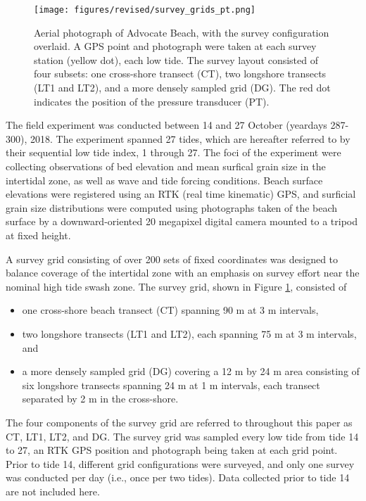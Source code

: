 \documentclass[jmse,article,submit,pdftex,moreauthors]{Definitions/mdpi}
\begin{document}
\begin{figure}[tbp] %
	\texttt{[image: figures/revised/survey\_grids\_pt.png]}
	\caption[Advocate Beach aerial photograph and survey grid configuration]{Aerial photograph of Advocate Beach, with the survey configuration overlaid. A GPS point and photograph were taken at each survey station (yellow dot), each low tide. The survey layout consisted of four subsets: one cross-shore transect (CT), two longshore transects (LT1 and LT2), and a more densely sampled grid (DG). The red dot indicates the position of the pressure transducer (PT). \label{fig:survey_grids}}
\end{figure}

The field experiment was conducted between 14 and 27 October (yeardays 287-300), 2018. The experiment spanned 27 tides, which are hereafter referred to by their sequential low tide index, 1 through 27. The foci of the experiment were collecting observations of bed elevation and mean surfical grain size in the intertidal zone, as well as wave and tide forcing conditions. Beach surface elevations were registered using an RTK (real time kinematic) GPS, and surficial grain size distributions were computed using photographs taken of the beach surface by a downward-oriented 20 megapixel digital camera mounted to a tripod at fixed height. 

A survey grid consisting of over 200 sets of fixed coordinates was designed to balance coverage of the intertidal zone with an emphasis on survey effort near the nominal high tide swash zone. The survey grid, shown in Figure \ref{fig:survey_grids}, consisted of

\begin{itemize}
	\item one cross-shore beach transect (CT) spanning 90 m at 3 m intervals,
	\item two longshore transects (LT1 and LT2), each spanning 75 m at 3 m intervals, and 
	\item a more densely sampled grid (DG) covering a 12 m by 24 m area consisting of six longshore transects spanning 24 m at 1 m intervals, each transect separated by 2 m in the cross-shore.
\end{itemize}

The four components of the survey grid are referred to throughout this paper as CT, LT1, LT2, and DG. The survey grid was sampled every low tide from tide 14 to 27, an RTK GPS position and photograph being taken at each grid point. Prior to tide 14, different grid configurations were surveyed, and only one survey was conducted per day (i.e., once per two tides). Data collected prior to tide 14 are not included here. 
\end{document}
